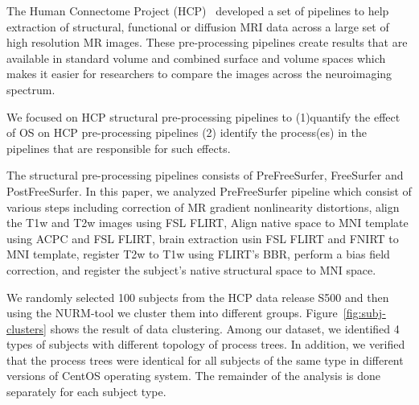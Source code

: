 \documentclass[a4paper,num-refs]{oup-contemporary}
\begin{document}
The Human Connectome Project (HCP)~\cite{glasser2013minimal} developed 
a set of pipelines to help extraction of structural, functional or 
diffusion MRI data across a large set of high resolution MR images. 
These pre-processing pipelines create results that are available in 
standard volume and combined surface and volume spaces which makes it 
easier for researchers to compare the images across the neuroimaging 
spectrum. 

We focused on HCP structural pre-processing pipelines to (1)quantify 
the effect of OS on HCP pre-processing pipelines (2) identify the 
process(es) in the pipelines that are responsible for such effects.

The structural pre-processing pipelines consists of PreFreeSurfer, 
FreeSurfer and PostFreeSurfer. In this paper, 
we analyzed PreFreeSurfer pipeline which consist of various steps 
including correction of MR 
gradient nonlinearity distortions, align the T1w and T2w images using 
FSL FLIRT, Align native space to MNI template using ACPC and FSL FLIRT, 
brain extraction usin FSL FLIRT and FNIRT to MNI template, register T2w 
to T1w using FLIRT's BBR, perform a bias field correction, and register 
the subject's native structural space to MNI space.  

We randomly selected 100 subjects from the HCP data release S500 and then 
using the NURM-tool we cluster them into different groups. 
Figure~\ref{fig:subj-clusters} shows the result of data clustering. 
Among our dataset, we identified 4 types of subjects with 
different topology of process trees. In addition, we verified that 
the process trees were identical for all subjects of the same type in 
different versions of CentOS operating system. The remainder of the 
analysis is done separately for each subject type.

\end{document}
